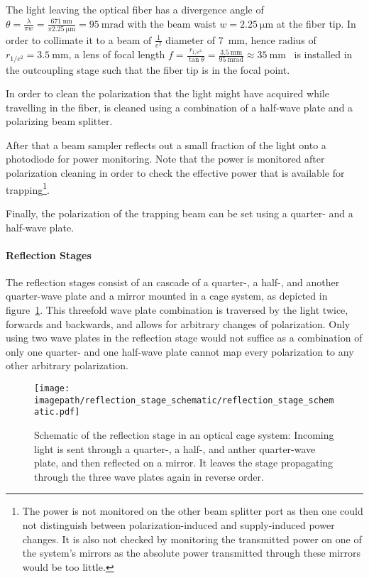 The light leaving the optical fiber has a divergence angle of $\theta = \frac{\lambda}{\pi w} = \frac{\SI{671}{\nano\meter}}{\pi\SI{2.25}{\micro\meter}} = \SI{95}{\milli\radian}$ with the beam waist $w = \SI{2.25}{\micro\meter}$ at the fiber tip. In order to collimate it to a beam of $\frac{1}{e^2}$ diameter of \SI{7}{\milli\meter}, hence radius of $r_{1/e^2} = \SI{3.5}{\milli\meter}$, a lens of focal length $f = \frac{r_{1/e^2}}{\tan \theta} = \frac{\SI{3.5}{\milli\meter}}{\SI{95}{\milli\radian}} \approx \SI{35}{\milli\meter}$~\cite{noauthor_collimated_2021} is installed in the outcoupling stage such that the fiber tip is in the focal point.

In order to clean the polarization that the light might have acquired while travelling in the fiber, is cleaned using a combination of a half-wave plate and a polarizing beam splitter.

After that a beam sampler reflects out a small fraction of the light onto a photodiode for power monitoring. Note that the power is monitored after polarization cleaning in order to check the effective power that is available for trapping\footnote{The power is not monitored on the other beam splitter port as then one could not distinguish between polarization-induced and supply-induced power changes. It is also not checked by monitoring the transmitted power on one of the system's mirrors as the absolute power transmitted through these mirrors would be too little.}.

Finally, the polarization of the trapping beam can be set using a quarter- and a half-wave plate.

\paragraph{Reflection Stages}
The reflection stages consist of an cascade of a quarter-, a half-, and another quarter-wave plate and a mirror mounted in a cage system, as depicted in figure~\ref{fig:reflection_stage_schematic}. This threefold wave plate combination is traversed by the light twice, forwards and backwards, and allows for arbitrary changes of polarization. Only using two wave plates in the reflection stage would not suffice as a combination of only one quarter- and one half-wave plate cannot map every polarization to any other arbitrary polarization.

\begin{figure}
    \centering
    \texttt{[image: \\imagepath/reflection\_stage\_schematic/reflection\_stage\_schematic.pdf]}
    \caption{Schematic of the reflection stage in an optical cage system: Incoming light is sent through a quarter-, a half-, and anther quarter-wave plate, and then reflected on a mirror. It leaves the stage propagating through the three wave plates again in reverse order.}
    \label{fig:reflection_stage_schematic}
\end{figure}

